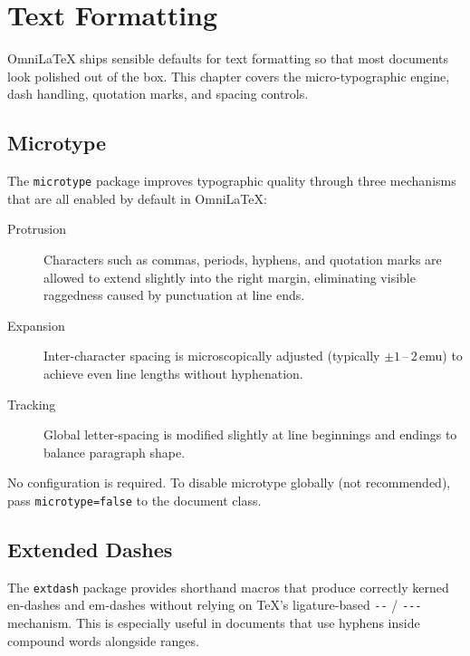 \chapter{Text Formatting}
\label{ch:text-formatting}

OmniLaTeX ships sensible defaults for text formatting so that most
documents look polished out of the box.  This chapter covers the
micro-typographic engine, dash handling, quotation marks, and spacing
controls.

\section{Microtype}

The \texttt{microtype} package improves typographic quality through three
mechanisms that are all enabled by default in OmniLaTeX:

\begin{description}
  \item[Protrusion] Characters such as commas, periods, hyphens, and
    quotation marks are allowed to extend slightly into the right margin,
    eliminating visible raggedness caused by punctuation at line ends.
  \item[Expansion] Inter-character spacing is microscopically adjusted
    (typically $\pm 1$\,--\,$2$\,emu) to achieve even line lengths
    without hyphenation.
  \item[Tracking] Global letter-spacing is modified slightly at line
    beginnings and endings to balance paragraph shape.
\end{description}

No configuration is required.  To disable microtype globally (not
recommended), pass \texttt{microtype=false} to the document class.

\section{Extended Dashes}

The \texttt{extdash} package provides shorthand macros that produce
correctly kerned en-dashes and em-dashes without relying on \TeX's
ligature-based \texttt{-{}-} / \texttt{-{}-{}-} mechanism.  This is
especially useful in documents that use hyphens inside compound words
alongside ranges.

